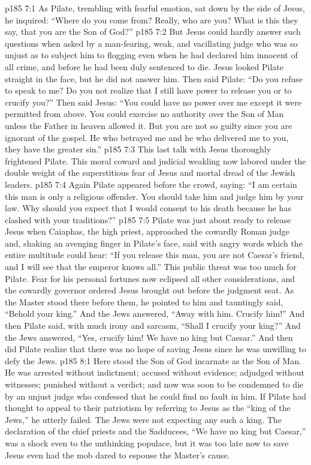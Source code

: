 \vs p185 7:1 As Pilate, trembling with fearful emotion, sat down by the side of Jesus, he inquired: “Where do you come from? Really, who are you? What is this they say, that you are the Son of God?”
\vs p185 7:2 But Jesus could hardly answer such questions when asked by a man\hyp{}fearing, weak, and vacillating judge who was so unjust as to subject him to flogging even when he had declared him innocent of all crime, and before he had been duly sentenced to die. Jesus looked Pilate straight in the face, but he did not answer him. Then said Pilate: “Do you refuse to speak to me? Do you not realize that I still have power to release you or to crucify you?” Then said Jesus: \textcolor{ubdarkred}{“You could have no power over me except it were permitted from above. You could exercise no authority over the Son of Man unless the Father in heaven allowed it. But you are not so guilty since you are ignorant of the gospel. He who betrayed me and he who delivered me to you, they have the greater sin.”}
\vs p185 7:3 This last talk with Jesus thoroughly frightened Pilate. This moral coward and judicial weakling now labored under the double weight of the superstitious fear of Jesus and mortal dread of the Jewish leaders.
\vs p185 7:4 Again Pilate appeared before the crowd, saying: “I am certain this man is only a religious offender. You should take him and judge him by your law. Why should you expect that I would consent to his death because he has clashed with your traditions?”
\vs p185 7:5 Pilate was just about ready to release Jesus when Caiaphas, the high priest, approached the cowardly Roman judge and, shaking an avenging finger in Pilate’s face, said with angry words which the entire multitude could hear: “If you release this man, you are not Caesar’s friend, and I will see that the emperor knows all.” This public threat was too much for Pilate. Fear for his personal fortunes now eclipsed all other considerations, and the cowardly governor ordered Jesus brought out before the judgment seat. As the Master stood there before them, he pointed to him and tauntingly said, “Behold your king.” And the Jews answered, “Away with him. Crucify him!” And then Pilate said, with much irony and sarcasm, “Shall I crucify your king?” And the Jews answered, “Yes, crucify him! We have no king but Caesar.” And then did Pilate realize that there was no hope of saving Jesus since he was unwilling to defy the Jews.
\vs p185 8:1 Here stood the Son of God incarnate as the Son of Man. He was arrested without indictment; accused without evidence; adjudged without witnesses; punished without a verdict; and now was soon to be condemned to die by an unjust judge who confessed that he could find no fault in him. If Pilate had thought to appeal to their patriotism by referring to Jesus as the “king of the Jews,” he utterly failed. The Jews were not expecting any such a king. The declaration of the chief priests and the Sadducees, “We have no king but Caesar,” was a shock even to the unthinking populace, but it was too late now to save Jesus even had the mob dared to espouse the Master’s cause.
